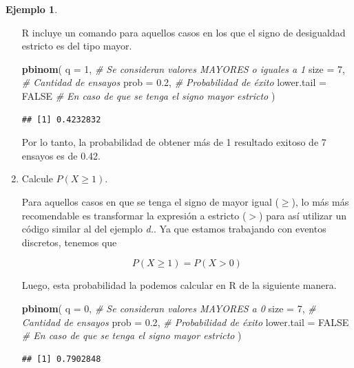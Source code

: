 \documentclass[
  11pt,
]{book}
\newenvironment{Shaded}{\begin{snugshade}}{\end{snugshade}}
\newcommand{\AttributeTok}[1]{\textcolor[rgb]{0.13,0.29,0.53}{#1}}
\newcommand{\CommentTok}[1]{\textcolor[rgb]{0.56,0.35,0.01}{\textit{#1}}}
\newcommand{\ConstantTok}[1]{\textcolor[rgb]{0.56,0.35,0.01}{#1}}
\newcommand{\DecValTok}[1]{\textcolor[rgb]{0.00,0.00,0.81}{#1}}
\newcommand{\FloatTok}[1]{\textcolor[rgb]{0.00,0.00,0.81}{#1}}
\newcommand{\FunctionTok}[1]{\textcolor[rgb]{0.13,0.29,0.53}{\textbf{#1}}}
\newcommand{\NormalTok}[1]{#1}
\theoremstyle{definition}
\theoremstyle{definition}
\newtheorem{example}{Ejemplo}[chapter]
\theoremstyle{definition}
\theoremstyle{definition}
\theoremstyle{remark}
\begin{document}
\begin{example}
\begin{enumerate}
  R incluye un comando para aquellos casos en los que el signo de desigualdad estricto es del tipo mayor.

\begin{Shaded}
\begin{Highlighting}[]
\FunctionTok{pbinom}\NormalTok{(}
  \AttributeTok{q =} \DecValTok{1}\NormalTok{, }\CommentTok{\# Se consideran valores MAYORES o iguales a 1}
  \AttributeTok{size =} \DecValTok{7}\NormalTok{, }\CommentTok{\# Cantidad de ensayos}
  \AttributeTok{prob =} \FloatTok{0.2}\NormalTok{, }\CommentTok{\# Probabilidad de éxito}
  \AttributeTok{lower.tail =} \ConstantTok{FALSE} \CommentTok{\# En caso de que se tenga el signo mayor estricto}
\NormalTok{)}
\end{Highlighting}
\end{Shaded}

\begin{verbatim}
## [1] 0.4232832
\end{verbatim}

  Por lo tanto, la probabilidad de obtener más de 1 resultado exitoso de 7 ensayos es de 0.42.
\item
  Calcule \(P(X \geq 1)\).

  Para aquellos casos en que se tenga el signo de mayor igual (\(\geq\)), lo más más recomendable es transformar la expresión a estricto (\(>\)) para así utilizar un código similar al del ejemplo \emph{d.}. Ya que estamos trabajando con eventos discretos, tenemos que

  \[P(X \geq 1) = P(X > 0)\]

  Luego, esta probabilidad la podemos calcular en R de la siguiente manera.

\begin{Shaded}
\begin{Highlighting}[]
\FunctionTok{pbinom}\NormalTok{(}
  \AttributeTok{q =} \DecValTok{0}\NormalTok{, }\CommentTok{\# Se consideran valores MAYORES a 0}
  \AttributeTok{size =} \DecValTok{7}\NormalTok{, }\CommentTok{\# Cantidad de ensayos}
  \AttributeTok{prob =} \FloatTok{0.2}\NormalTok{, }\CommentTok{\# Probabilidad de éxito}
  \AttributeTok{lower.tail =} \ConstantTok{FALSE} \CommentTok{\# En caso de que se tenga el signo mayor estricto}
\NormalTok{  )}
\end{Highlighting}
\end{Shaded}

\begin{verbatim}
## [1] 0.7902848
\end{verbatim}


\end{enumerate}
\end{example}
\end{document}
